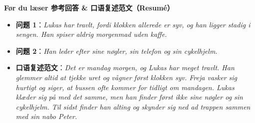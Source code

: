 \begin{answerbox}
\textbf{Før du læser 参考回答 \& 口语复述范文（Resumé）}
\begin{itemize}
  \item \textbf{问题 1}：\textit{Lukas har travlt, fordi klokken allerede er syv, og han ligger stadig i sengen. Han spiser aldrig morgenmad uden kaffe.}
  \item \textbf{问题 2}：\textit{Han leder efter sine nøgler, sin telefon og sin cykelhjelm.}
  \item \textbf{口语复述范文}：\textit{Det er mandag morgen, og Lukas har meget travlt. Han glemmer altid at tjekke uret og vågner først klokken syv. Freja vasker sig hurtigt og siger, at bussen ofte kommer for tidligt om mandagen. Lukas klæder sig på med det samme, men han finder først ikke sine nøgler og sin cykelhjelm. Til sidst finder han alting og skynder sig ned ad trappen sammen med sin nabo Peter.}
\end{itemize}
\end{answerbox}
